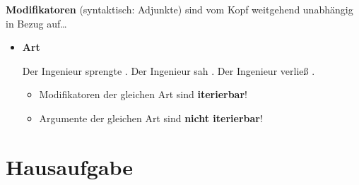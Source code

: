 \begin{frame}

\textbf{Modifikatoren} (syntaktisch: Adjunkte) sind vom Kopf weitgehend unabhängig in Bezug auf\dots

\begin{itemize}
	\item \textbf{Art}

\eal 
\ex Der Ingenieur sprengte . 
\ex Der Ingenieur sah . 
\ex Der Ingenieur verließ .
\zl

	\begin{itemize}
		\item Modifikatoren der gleichen Art sind \textbf{iterierbar}!
		\item Argumente der gleichen Art sind \textbf{nicht iterierbar}!
		
		\eal 
		\zl

		
	\end{itemize}

\end{itemize}

\end{frame}


\section{Hausaufgabe}


